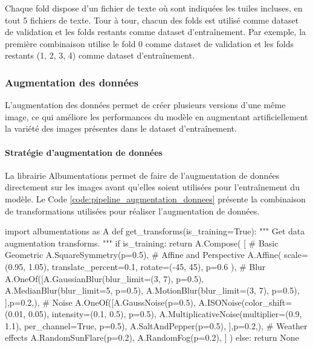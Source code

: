 Chaque fold dispose d'un fichier de texte où sont indiquées les tuiles incluses, en tout 5 fichiers de texte. Tour à tour, chacun des folds est utilisé comme dataset de validation et les folds restants comme dataset d'entraînement. Par exemple, la première combinaison utilise le fold 0 comme dataset de validation et les folds restants (1, 2, 3, 4) comme dataset d'entraînement.

\subsubsection{Augmentation des données}
\label{subsubsec:augmentation_donnees}
L'augmentation des données permet de créer plusieurs versions d'une même image, ce qui améliore les performances du modèle en augmentant artificiellement la variété des images présentes dans le dataset d'entraînement.

\paragraph{Stratégie d'augmentation de données}
La librairie Albumentations \cite{albumentations_albumentations_nodate} permet de faire de l'augmentation de données directement sur les images avant qu'elles soient utilisées pour l'entraînement du modèle. Le Code \ref{code:pipeline_augmentation_donnees} présente la combinaison de transformations utilisées pour réaliser l'augmentation de données.

\begin{code}[H]
    \begin{pythoncode}
    import albumentations as A
    def get_transforms(is_training=True):
        """
        Get data augmentation transforms.
        """
        if is_training:
            return A.Compose(
                [
                    # Basic Geometric
                    A.SquareSymmetry(p=0.5),
                    # Affine and Perspective
                    A.Affine(
                        scale=(0.95, 1.05), translate_percent=0.1, rotate=(-45, 45), p=0.6
                    ),
                    # Blur
                    A.OneOf([A.GaussianBlur(blur_limit=(3, 7), p=0.5),
                            A.MedianBlur(blur_limit=5, p=0.5),
                            A.MotionBlur(blur_limit=(3, 7), p=0.5),
                        ],p=0.2,),
                    # Noise
                    A.OneOf([A.GaussNoise(p=0.5),
                            A.ISONoise(color_shift=(0.01, 0.05), intensity=(0.1, 0.5), p=0.5),
                            A.MultiplicativeNoise(multiplier=(0.9, 1.1), per_channel=True, p=0.5),
                            A.SaltAndPepper(p=0.5),
                        ],p=0.2,),
                    # Weather effects
                    A.RandomSunFlare(p=0.2),
                    A.RandomFog(p=0.2),
                ]
            )
        else:
            return None
    \end{pythoncode}
    \label{code:pipeline_augmentation_donnees}
\end{code}

